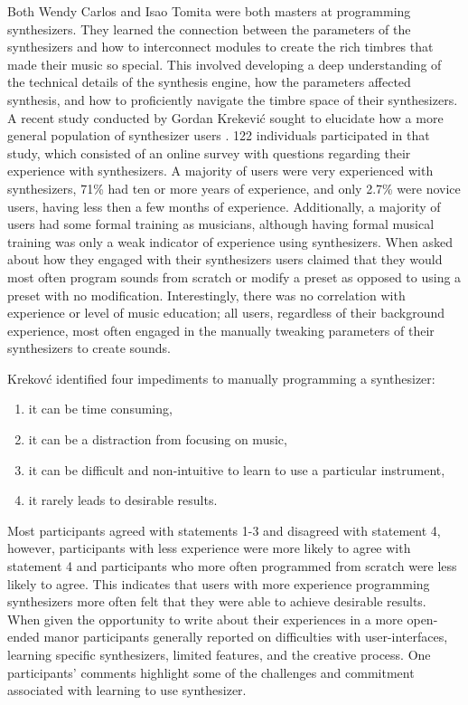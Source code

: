 Both Wendy Carlos and Isao Tomita were both masters at programming synthesizers. They learned the connection between the parameters of the synthesizers and how to interconnect modules to create the rich timbres that made their music so special. This involved developing a deep understanding of the technical details of the synthesis engine, how the parameters affected synthesis, and how to proficiently navigate the timbre space of their synthesizers. A recent study conducted by Gordan Krekevi\'{c} sought to elucidate how a more general population of synthesizer users \cite{krekovic2019insights}. 122 individuals participated in that study, which consisted of an online survey with questions regarding their experience with synthesizers. A majority of users were very experienced with synthesizers, 71\% had ten or more years of experience, and only 2.7\% were novice users, having less then a few months of experience. Additionally, a majority of users had some formal training as musicians, although having formal musical training was only a weak indicator of experience using synthesizers. When asked about how they engaged with their synthesizers users claimed that they would most often program sounds from scratch or modify a preset as opposed to using a preset with no modification. Interestingly, there was no correlation with experience or level of music education; all users, regardless of their background experience, most often engaged in the manually tweaking parameters of their synthesizers to create sounds. 

Krekov\'{c} identified four impediments to manually programming a synthesizer:
\begin{enumerate}
    \item it can be time consuming,
    \item it can be a distraction from focusing on music,
    \item it can be difficult and non-intuitive to learn to use a particular instrument,
    \item it rarely leads to desirable results.
\end{enumerate}

Most participants agreed with statements 1-3 and disagreed with statement 4, however, participants with less experience were more likely to agree with statement 4 and participants who more often programmed from scratch were less likely to agree. This indicates that users with more experience programming synthesizers more often felt that they were able to achieve desirable results. When given the opportunity to write about their experiences in a more open-ended manor participants generally reported on difficulties with user-interfaces, learning specific synthesizers, limited features, and the creative process. One participants' comments highlight some of the challenges and commitment associated with learning to use synthesizer.

